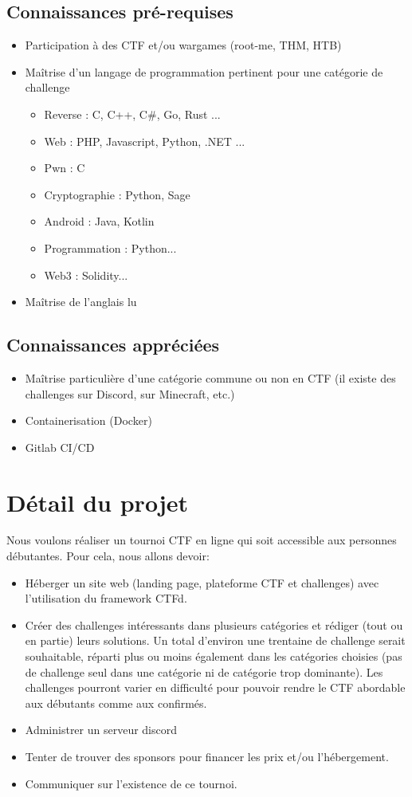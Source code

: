 \documentclass[12pt]{article}
\begin{document}
    \subsection{Connaissances pré-requises}
	\begin{itemize}
		\item Participation à des CTF et/ou wargames (root-me, THM, HTB)
		\item Maîtrise d'un langage de programmation pertinent pour une catégorie de challenge 
		\begin{itemize}
			\item Reverse :  C, C++, C\#, Go, Rust ...
			\item Web : PHP, Javascript, Python, .NET ...
			\item Pwn : C
			\item Cryptographie : Python, Sage
			\item Android : Java, Kotlin
			\item Programmation : Python...
			\item Web3 : Solidity...
		\end{itemize}
		\item Maîtrise de l'anglais lu
	\end{itemize}
	
	\subsection{Connaissances appréciées}
	\begin{itemize}
		\item Maîtrise particulière d'une catégorie commune ou non en CTF (il existe des challenges sur Discord, sur Minecraft, etc.)
		\item Containerisation (Docker)
		\item Gitlab CI/CD
	\end{itemize}

    \section{Détail du projet}
    Nous voulons réaliser un tournoi CTF en ligne qui soit accessible aux personnes débutantes. Pour cela, nous allons devoir:
    \begin{itemize}
        \item{Héberger un site web (landing page, plateforme CTF et challenges) avec l’utilisation du framework CTFd.}
        \item{Créer des challenges intéressants dans plusieurs catégories et rédiger (tout ou en partie) leurs solutions. Un total d’environ une trentaine de challenge serait souhaitable, réparti plus ou moins également dans les catégories choisies (pas de challenge seul dans une catégorie ni de catégorie trop dominante). Les challenges pourront varier en difficulté pour pouvoir rendre le CTF abordable aux débutants comme aux confirmés.}
        \item{Administrer un serveur discord}
        \item{Tenter de trouver des sponsors pour financer les prix et/ou l’hébergement.}
        \item{Communiquer sur l’existence de ce tournoi.}
    \end{itemize}
\end{document}
